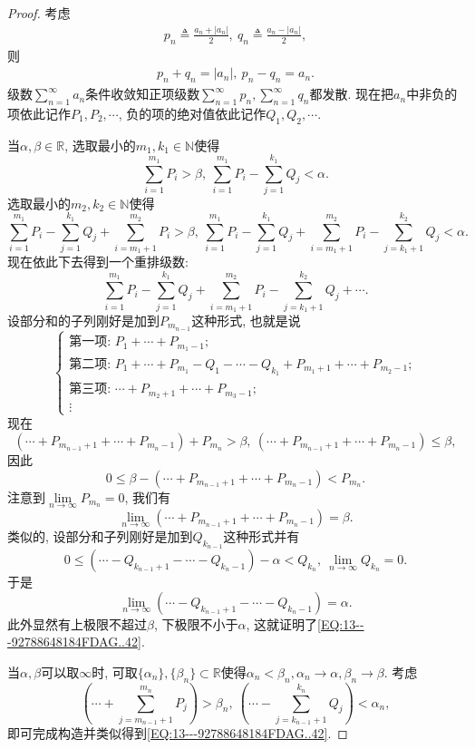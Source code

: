 \documentclass[../../main.tex]{subfiles}%
\begin{document}
\begin{proof}
考虑
\begin{align}\label{EQ:13---92788648184FDAG..43}
p_n\triangleq\frac{a_n+|a_n|}{2},\ q_n\triangleq\frac{a_n-|a_n|}{2},
\end{align}
则
\begin{align}\label{EQ:13---92788648184FDAG..44}
p_n+q_n=|a_n|,\ p_n-q_n=a_n.
\end{align}
级数$\sum\limits_{n=1}^{\infty}a_n$条件收敛知正项级数$\sum\limits_{n=1}^{\infty}p_n,\sum\limits_{n=1}^{\infty}q_n$都发散. 现在把$a_n$中非负的项依此记作$P_1,P_2,\cdots$, 负的项的绝对值依此记作$Q_1,Q_2,\cdots$.

当$\alpha,\beta\in\mathbb{R}$, 选取最小的$m_1,k_1\in\mathbb{N}$使得
$$\sum_{i=1}^{m_1}P_i>\beta,\ \sum_{i=1}^{m_1}P_i-\sum_{j=1}^{k_1}Q_j<\alpha.$$
选取最小的$m_2,k_2\in\mathbb{N}$使得
$$\sum_{i=1}^{m_1}P_i-\sum_{j=1}^{k_1}Q_j+\sum_{i=m_1+1}^{m_2}P_i>\beta,\ \sum_{i=1}^{m_1}P_i-\sum_{j=1}^{k_1}Q_j+\sum_{i=m_1+1}^{m_2}P_i-\sum_{j=k_1+1}^{k_2}Q_j<\alpha.$$
现在依此下去得到一个重排级数:
$$\sum_{i=1}^{m_1}P_i-\sum_{j=1}^{k_1}Q_j+\sum_{i=m_1+1}^{m_2}P_i-\sum_{j=k_1+1}^{k_2}Q_j+\cdots.$$
设部分和的子列刚好是加到$P_{m_{n-1}}$这种形式, 也就是说
$$
\begin{cases}
\text{第一项: } P_1+\cdots+P_{m_1-1}; \\
\text{第二项: } P_1+\cdots+P_{m_1}-Q_1-\cdots-Q_{k_1}+P_{m_1+1}+\cdots+P_{m_2-1}; \\
\text{第三项: } \cdots+P_{m_2+1}+\cdots+P_{m_3-1}; \\
\vdots
\end{cases}
$$
现在
$$(\cdots+P_{m_{n-1}+1}+\cdots+P_{m_n-1})+P_{m_n}>\beta,\ (\cdots+P_{m_{n-1}+1}+\cdots+P_{m_n-1})\leqslant\beta,$$
因此
$$0\leqslant\beta-(\cdots+P_{m_{n-1}+1}+\cdots+P_{m_n-1})<P_{m_n}.$$
注意到$\lim\limits_{n\to\infty}P_{m_n}=0$, 我们有
$$\lim\limits_{n\to\infty}(\cdots+P_{m_{n-1}+1}+\cdots+P_{m_n-1})=\beta.$$
类似的, 设部分和子列刚好是加到$Q_{k_{n-1}}$这种形式并有
$$0\leqslant(\cdots-Q_{k_{n-1}+1}-\cdots-Q_{k_n-1})-\alpha<Q_{k_n},\ \lim\limits_{n\to\infty}Q_{k_n}=0.$$
于是
$$\lim\limits_{n\to\infty}(\cdots-Q_{k_{n-1}+1}-\cdots-Q_{k_n-1})=\alpha.$$
此外显然有上极限不超过$\beta$, 下极限不小于$\alpha$, 这就证明了\eqref{EQ:13---92788648184FDAG..42}.

当$\alpha,\beta$可以取$\infty$时, 可取$\{\alpha_n\},\{\beta_n\}\subset\mathbb{R}$使得$\alpha_n<\beta_n,\alpha_n\to\alpha,\beta_n\to\beta$. 考虑
$$\left(\cdots+\sum_{j=m_{n-1}+1}^{m_n}P_j\right)>\beta_n,\ \left(\cdots-\sum_{j=k_{n-1}+1}^{k_n}Q_j\right)<\alpha_n,$$
即可完成构造并类似得到\eqref{EQ:13---92788648184FDAG..42}.
\end{proof}
\end{document}
